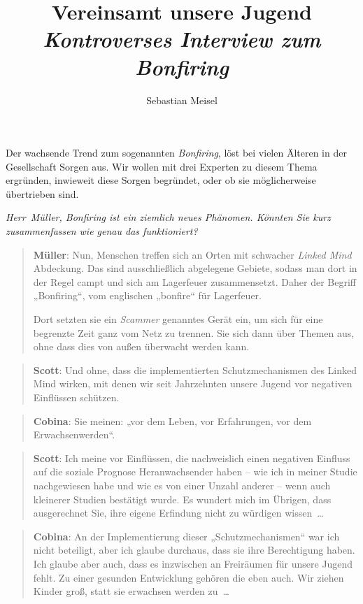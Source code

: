 \documentclass{scrartcl}
\title{Vereinsamt unsere Jugend\\
\emph{Kontroverses Interview zum Bonfiring} \\}
\author{Sebastian Meisel}
\newenvironment{frage}{\itshape}{}
\newenvironment{antworta}{
  \begin{quotation}
  }{
  \end{quotation}
}
\newenvironment{antwortb}{
  \begin{quotation}
  }{
  \end{quotation}
}
\newcommand{\name}[1]{\textbf{#1}}
\begin{document}
\maketitle


{Der wachsende Trend zum sogenannten \emph{Bonfiring}, löst bei
vielen Älteren in der Gesellschaft Sorgen aus. Wir wollen
mit drei Experten zu diesem Thema ergründen, inwieweit diese
Sorgen begründet, oder ob sie möglicherweise übertrieben sind.\\}

\begin{frage}
Herr~Müller, Bonfiring ist ein ziemlich neues
Phänomen. Könnten Sie kurz zusammenfassen wie genau das
funktioniert?
\end{frage}


\begin{antworta}
\name{Müller}: Nun, Menschen treffen sich an Orten mit schwacher
\emph{Linked Mind} Abdeckung. Das sind ausschließlich
abgelegene Gebiete, sodass man dort in der Regel campt
und sich am Lagerfeuer zusammensetzt. Daher der Begriff
„Bonfiring“, vom englischen „bonfire“ für Lagerfeuer.

Dort setzten sie ein \emph{Scammer} genanntes Gerät ein, um sich
für eine begrenzte Zeit ganz vom Netz zu trennen. Sie sich
dann über Themen aus, ohne dass dies von außen überwacht
werden kann.
\end{antworta}


\begin{antwortb}
\name{Scott}: Und ohne, dass die implementierten Schutzmechanismen
des Linked Mind wirken, mit denen wir seit Jahrzehnten
unsere Jugend vor negativen Einflüssen schützen.
\end{antwortb}


\begin{antworta}
\name{Cobina}: Sie meinen: „vor dem Leben, vor Erfahrungen,
vor dem Erwachsenwerden“.
\end{antworta}


\begin{antwortb}
\name{Scott}: Ich meine vor Einflüssen, die nachweislich einen
negativen Einfluss auf die soziale Prognose
Heranwachsender haben – wie ich in meiner Studie
nachgewiesen habe und wie es von einer Unzahl anderer –
wenn auch kleinerer Studien bestätigt wurde. Es wundert
mich im Übrigen, dass ausgerechnet Sie, ihre eigene
Erfindung nicht zu würdigen wissen~…
\end{antwortb}


\begin{antworta}
\name{Cobina}: An der Implementierung dieser
„Schutzmechanismen“ war ich nicht beteiligt, aber ich
glaube durchaus, dass sie ihre Berechtigung haben. Ich
glaube aber auch, dass es inzwischen an Freiräumen für
unsere Jugend fehlt. Zu einer gesunden Entwicklung
gehören die eben auch. Wir ziehen Kinder groß, statt sie
erwachsen werden zu~…
\end{antworta}
\end{document}
